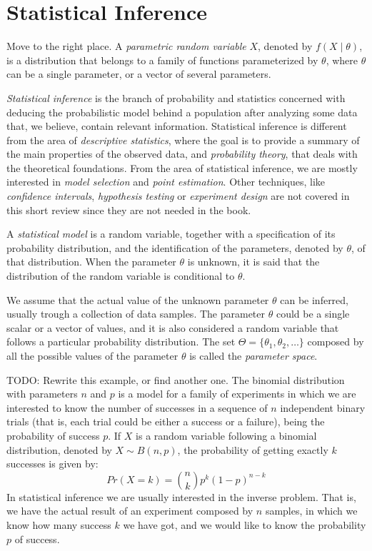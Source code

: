 %
%

\section{Statistical Inference}

{\color{red} Move to the right place.} A \emph{parametric random variable} $X$, denoted by $f\left(X \mid \theta \right)$, is a distribution that belongs to a family of functions parameterized by $\theta$, where $\theta$ can be a single parameter, or a vector of several parameters. 

\emph{Statistical inference} is the branch of probability and statistics concerned with deducing the probabilistic model behind a population after analyzing some data that, we believe, contain relevant information. Statistical inference is different from the area of \emph{descriptive statistics}, where the goal is to provide a summary of the main properties of the observed data, and \emph{probability theory}, that deals with the theoretical foundations. From the area of statistical inference, we are mostly interested in \emph{model selection} and \emph{point estimation}. Other techniques, like \emph{confidence intervals}, \emph{hypothesis testing} or \emph{experiment design} are not covered in this short review since they are not needed in the book.

\begin{definition}
A \emph{statistical model} is a random variable, together with a specification of its probability distribution, and the identification of the parameters, denoted by $\theta$, of that distribution. When the parameter $\theta$ is unknown, it is said that the distribution of the random variable is conditional to $\theta$.
\end{definition}

We assume that the actual value of the unknown parameter $\theta$ can be inferred, usually trough a collection of data samples. The parameter $\theta$ could be a single scalar or a vector of values, and it is also considered a random variable that follows a particular probability distribution. The set $\Theta = \{ \theta_1, \theta_2, \ldots \}$ composed by all the possible values of the parameter $\theta$ is called the \emph{parameter space}.

\begin{example}
\label{ex:binomial}
{\color{red} TODO: Rewrite this example, or find another one.}
The binomial distribution with parameters $n$ and $p$ is a model for a family of experiments in which we are interested to know the number of successes in a sequence of $n$ independent binary trials (that is, each trial could be either a success or a failure), being the probability of success $p$. If $X$ is a random variable following a binomial distribution, denoted by $X \sim B(n,p)$, the probability of getting exactly $k$ successes is given by:
\[
Pr(X=k) = {\binom {n}{k}}p^{k}(1-p)^{n-k}
\]
In statistical inference we are usually interested in the inverse problem. That is, we have the actual result of an experiment composed by $n$ samples, in which we know how many success $k$ we have got, and we would like to know the probability $p$ of success.
\end {example}

